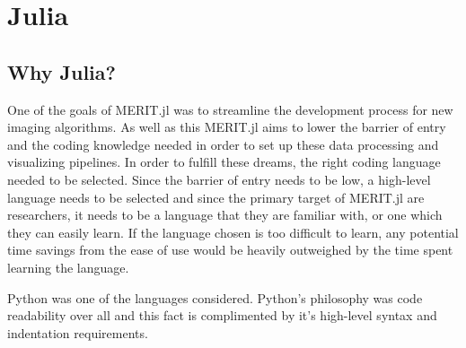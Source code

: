 \chapter*{Julia}

\section{Why Julia?}
One of the goals of MERIT.jl was to streamline the development process for new imaging algorithms. As well as this
MERIT.jl aims to lower the barrier of entry and the coding knowledge needed in order to set up these data processing and
visualizing pipelines. In order to fulfill these dreams, the right coding language needed to be selected. Since the
barrier of entry needs to be low, a high-level language needs to be selected and since the primary target of MERIT.jl
are researchers, it needs to be a language that they are familiar with, or one which they can easily learn. If the
language chosen is too difficult to learn, any potential time savings from the ease of use would be heavily outweighed
by the time spent learning the language. \hfill \break

Python was one of the languages considered. Python's philosophy was code readability over all and this fact is
complimented by it's high-level syntax and indentation requirements.